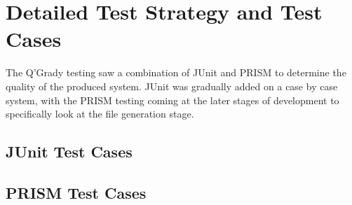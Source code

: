 \documentclass[report.tex]{subfiles}
\begin{document}
\chapter{Detailed Test Strategy and Test Cases} %
\label{cha:detailed_test_strategy_and_test_cases}
The Q'Grady testing saw a combination of JUnit and PRISM to determine the
quality of the produced system. JUnit was gradually added on a case by case
system, with the PRISM testing coming at the later stages of development to
specifically look at the file generation stage.

\section{JUnit Test Cases} %
\label{sec:junit_test_cases}


\section{PRISM Test Cases} %
\label{sec:prism_test_cases}

\newpage
\end{document}
